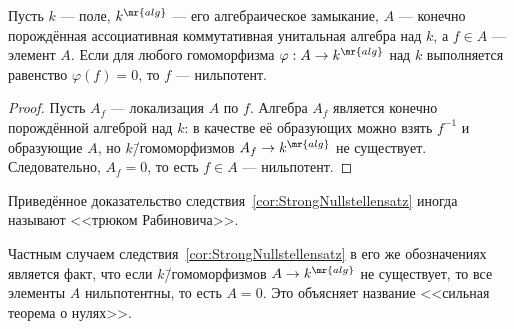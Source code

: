 \documentclass[
	extrafontsizes,
	11pt,
	hyphens,
]{memoir}
\begin{document}
%

\begin{corollary}
Пусть \(k\) --- поле, \(k^\mr{alg}\) --- его алгебраическое замыкание, \(A\) --- конечно порождённая ассоциативная коммутативная унитальная алгебра над \(k\), а \(f \in A\) --- элемент \(A\).
\label{cor:StrongNullstellensatz}
Если для любого гомоморфизма \(\varphi : A \to k^\mr{alg}\) над \(k\) выполняется равенство \(\varphi(f) = 0\), то \(f\) --- нильпотент.
\end{corollary}

\begin{proof}
Пусть \(A_f\) --- локализация \(A\) по \(f\). Алгебра \(A_f\) является конечно порождённой алгеброй над \(k\): в качестве её образующих можно взять \(f^{-1}\) и образующие \(A\), но \(k\)\=/гомоморфизмов \(A_f \to k^\mr{alg}\) не существует. Следовательно, \(A_f = 0\), то есть \(f \in A\) --- нильпотент.
\end{proof}

\begin{remark}
Приведённое доказательство следствия~\ref{cor:StrongNullstellensatz} иногда называют <<трюком Рабиновича>>.
\end{remark}


\begin{remark}
Частным случаем следствия~\ref{cor:StrongNullstellensatz} в его же обозначениях является факт, что если
\(k\)\=/гомоморфизмов \(A \to k^{\mr{alg}}\) не существует, то все элементы \(A\) нильпотентны, то есть \(A = 0\).
Это объясняет название <<сильная теорема о нулях>>.
\end{remark}
\end{document}
